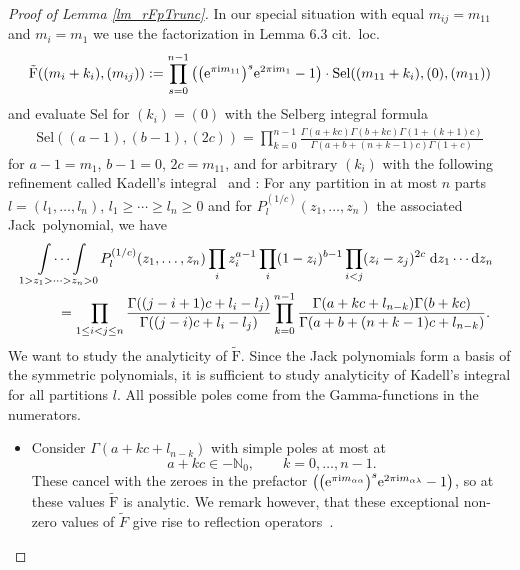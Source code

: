 \documentclass[10pt,a4paper]{amsart}
\numberwithin{equation}{section}
\newcommand{\N}{\mathbb{N}}
\renewcommand{\d}{\mathrm{d}}
\newcommand{\Sel}{\mathrm{Sel}}
\newcommand{\rFp}{\tilde{\mathrm{F}}}
\begin{document}
\begin{proof}[Proof of Lemma \ref{lm_rFpTrunc}]
	 In our special situation with equal $m_{ij}=m_{11}$ and $m_i=m_1$ we use the factorization in Lemma 6.3 cit.~loc.
	\begin{gather*}
	\rFp((m_{i}+k_i),(m_{ij}))
	:=\prod_{s=0}^{n-1} \big( \big({\rm e}^{\pi {\rm i} m_{11}}\big)^s {\rm e}^{2\pi {\rm i} m_{1}} -1 \big) \cdot
	\Sel((m_{11}+k_i),(0),(m_{11}))
	\end{gather*}
	and evaluate $\Sel$ for $(k_i)=(0)$ with the Selberg integral formula \cite{Sel44}
	\begin{gather*}
	\Sel((a-1),(b-1),(2c))  = \prod_{k=0}^{n-1} \frac{\Gamma(a + kc)\Gamma(b + kc)\Gamma(1 + (k+1)c)}{\Gamma(a + b + (n+k-1)c)\Gamma(1 + c)}
	\end{gather*}
	for $a-1=m_{1}$, $b-1=0$, $2c=m_{11}$, and for arbitrary $(k_i)$ with the following refinement called Kadell's integral~\cite{Kad97} and \cite[Section~VI.10]{Mac95}:
	For any partition in at most $n$ parts
	$l=(l_1,\dots,l_n)$, $l_1\geq \cdots \geq l_n\geq 0$ and for $P_{l}^{(1/c)}(z_1,\dots, z_n)$ the associated Jack~polynomial, we have
	\begin{gather*}
	 \idotsint\limits_{1> z_1>\dots >z_{n}> 0}
	P_{l}^{(1/c)}(z_1,\dots, z_n)\prod_i z_i^{a-1}\prod_i (1-z_i)^{b-1}\prod_{i<j} (z_i-z_j)^{2c} \;\d z_1\cdots \d z_{n}\\
	\qquad{} =\prod_{1\leq i<j\leq n}\frac{\Gamma((j-i+1)c+l_i-l_j)}
	{\Gamma((j-i)c+l_i-l_j)}
	\prod_{k=0}^{n-1}
	\frac{\Gamma(a+kc+l_{n-k})\Gamma(b+kc)}
	{\Gamma(a+b+(n+k-1)c+l_{n-k})}.
	\end{gather*}
We want to study the analyticity of $\rFp$. Since the Jack polynomials form a basis of the symmetric polynomials, it is sufficient to study analyticity of Kadell's integral for all partitions $l$. All possible poles come from the Gamma-functions in the numerators.
	\begin{itemize}\itemsep=0pt
		\item Consider $\Gamma(a+kc+l_{n-k})$ with simple poles at most at
		\[a+ k c \in -\N_0, \qquad k=0,\dots,n-1.\]
		These cancel with the zeroes in the prefactor $\big(\big({\rm e}^{\pi {\rm i} m_{\alpha\alpha}}\big)^s {\rm e}^{2\pi {\rm i} m_{\alpha\lambda}} -1\big)$, so at these values $\rFp$ is analytic. We remark however, that these exceptional non-zero values of $\tilde{F}$ give rise to reflection operators~\cite[Section~6.3]{Len17}.
		

\end{itemize}
\end{proof}
\end{document}
